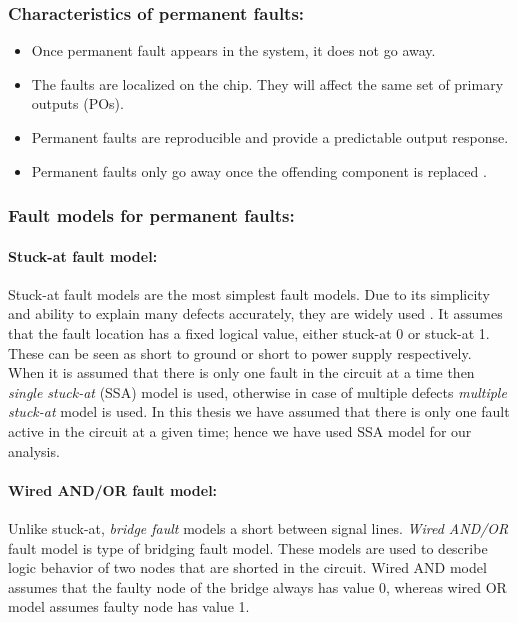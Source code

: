 \subsubsection{Characteristics of permanent faults:}
\begin{itemize}
	\item Once permanent fault appears in the system, it does not go away.
	\item The faults are localized on the chip. They will affect the same set of primary outputs (POs).
	\item Permanent faults are reproducible and provide a predictable output response.
 	\item Permanent faults only go away once the offending component is replaced \cite{Constantinescu2007}.
\end{itemize}

\subsubsection{Fault models for permanent faults:}
\paragraph{Stuck-at fault model:}
Stuck-at fault models are the most simplest fault models. Due to its simplicity and ability to explain many defects accurately, they are widely used \cite{Larsson2006}. It assumes that the fault location has a fixed logical value, either stuck-at 0 or stuck-at 1. These can be seen as short to ground or short to power supply respectively. When it is assumed that there is only one fault in the circuit at a time then \emph{single stuck-at} (SSA) model is used, otherwise in case of multiple defects \emph{multiple stuck-at} model is used. In this thesis we have assumed that there is only one fault active in the circuit at a given time; hence we have used SSA model for our analysis.

\paragraph{Wired AND/OR fault model:}
Unlike stuck-at, \emph{bridge fault} models a short between signal lines. \emph{Wired AND/OR} fault model is type of bridging fault model. These models are used to describe logic behavior of two nodes that are shorted in the circuit. Wired AND model assumes that the faulty node of the bridge always has value 0, whereas wired OR model assumes faulty node has value 1. 

